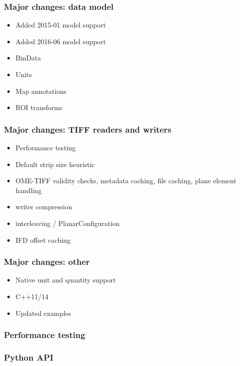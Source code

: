 \documentclass{beamer}
\begin{document}
\begin{frame}[fragile]
  \frametitle{Major changes: data model}

  \begin{itemize}
  \item Added 2015-01 model support
  \item Added 2016-06 model support
  \item BinData
  \item Units
  \item Map annotations
  \item ROI transforms
  \end{itemize}
\end{frame}

\begin{frame}[fragile]
  \frametitle{Major changes: TIFF readers and writers}

  \begin{itemize}
  \item Performance testing
  \item Default strip size heuristic
  \item OME-TIFF validity checks, metadata caching, file caching, plane element handling
  \item writer compression
  \item interleaving / PlanarConfiguration
  \item IFD offset caching
    
  \end{itemize}
\end{frame}

\begin{frame}[fragile]
  \frametitle{Major changes: other}

  \begin{itemize}
  \item Native unit and quantity support
  \item C++11/14
  \item Updated examples
  \end{itemize}
\end{frame}

\begin{frame}[fragile]
  \frametitle{Performance testing}

  \begin{itemize}
  \end{itemize}
\end{frame}

\begin{frame}[fragile]
  \frametitle{Python API}

  \begin{itemize}
  \end{itemize}
\end{frame}
\end{document}
